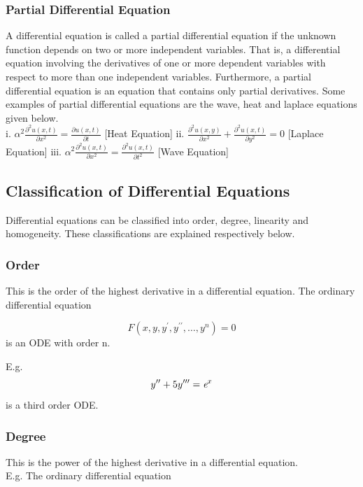 \documentclass[12pt]{report}
\begin{document}
	\subsubsection{Partial Differential Equation} 
	A differential equation is called a partial differential equation if the unknown function depends on two or more independent variables. That is, a differential equation involving the derivatives of one or more dependent variables with respect to more than one independent variables. Furthermore, a partial differential equation is an equation that contains only partial derivatives. Some examples of partial differential equations are the wave, heat and laplace equations given below. \\
\smallskip
i. $\alpha^{2}\frac{\partial^{2}u(x,t)}{\partial x^{2}} =  \frac{\partial u(x,t)}{\partial t} $    [Heat Equation]
ii. $\frac{\partial^{2}u(x,y)}{\partial x^{2}} + \frac{\partial^{2}u(x,t)}{\partial y^{2}} = 0 $   [Laplace Equation]  
iii. $\alpha^{2}\frac{\partial^{2}u(x,t)}{\partial x^{2}} = \frac{\partial^{2}u(x,t)}{\partial t^{2}} $   [Wave Equation]

	
	\subsection{Classification of Differential Equations} 
	Differential equations can be classified into order, degree, linearity and homogeneity. These classifications are explained respectively below.
	\subsubsection{Order} 
	This is the order of the highest derivative in a differential equation. The ordinary differential equation
	
		\begin{equation}
	 F(x,y,y^\prime,y^{\prime\prime},\dots,y^n ) = 0
		\end{equation} is an ODE with order n. 
	
	\medskip E.g. \begin{equation}
	y^{\prime\prime} + 5y^{\prime\prime\prime} = \textit e^x
	\end{equation}  is a third order ODE.
	
	\subsubsection{Degree}
	This is the power of the highest derivative in a differential equation. \\ E.g. The ordinary differential equation
	
\end{document}
